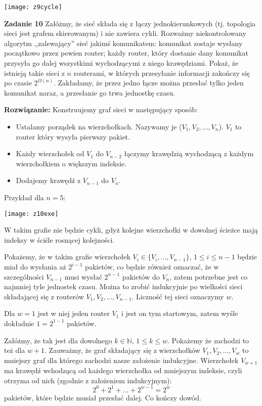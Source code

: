 \documentclass[12pt,a4paper]{article}
\begin{document}
\begin{center}
	\texttt{[image: z9cycle]}	
\end{center}

\vskip 0.2cm
\noindent
\textbf{Zadanie 10} Załóżmy, że sieć składa się z łączy jednokierunkowych (tj. topologia sieci jest grafem skierowanym) i nie zawiera cykli. Rozważmy niekontrolowany algorytm ,,zalewający'' sieć jakimś komunikatem: komunikat zostaje wysłany początkowo przez pewien router; każdy router, który dostanie dany komunikat przysyła go dalej wszystkimi wychodzącymi z niego krawędziami. Pokaż, że istnieją takie sieci z \(n\) routerami, w których przesyłanie informacji zakończy się po czasie \(2^{\Omega(n)}\). Zakładamy, że przez jedno łącze można przesłać tylko jeden komunikat naraz, a przesłanie go trwa jednostkę czasu.
\vskip 0.2cm

\noindent
\textbf{Rozwiązanie:} Konstruujemy graf sieci w następujący sposób:

\begin{itemize}
	\item Ustalamy porządek na wierzchołkach. Nazywamy je (\(V_1, V_2, ..., V_n\)). \(V_1\) to router który wysyła pierwszy pakiet.
	\item Każdy wierzchołek od \(V_1\) do \(V_{n-2}\) łączymy krawędzią wychodzącą z każdym wierzchołkiem o większym indeksie.
	\item Dodajemy krawędź z \(V_{n-1}\) do \(V_n\).
\end{itemize}

\noindent
Przykład dla \(n=5\):

\begin{center}
	\texttt{[image: z10exe]}	
\end{center}

\noindent
W takim grafie nie będzie cykli, gdyż kolejne wierzchołki w dowolnej ścieżce mają indeksy w ściśle rosnącej kolejności.

Pokażemy, że w takim grafie wierzchołek \(V_i \in \{V_i,...,V_{n-1}\} \), \( 1 \leq i \leq n-1\) będzie miał do wysłania aż \(2^{i-1}\) pakietów, co będzie również oznaczać, że w szczególności \(V_{n-1}\) musi wysłać \(2^{n-1}\) pakietów do \(V_n\), zatem potrzebne jest co najmniej tyle jednostek czasu. Można to zrobić indukcyjnie po wielkości sieci składającej się z routerów \(V_1, V_2, ..., V_{n-1}\). Liczność tej sieci oznaczymy \(w\).

Dla \(w=1\) jest w niej jeden router \(V_1\) i jest on tym startowym, zatem wyśle dokładnie \(1 = 2^{1 - 1}\) pakietów.

Załóżmy, że tak jest dla dowolnego \(k \in \mathbb{N}\), \( 1 \leq k \leq w\). Pokażemy że zachodzi to też dla \(w+1\). Zauważmy, że graf składający się z wierzchołków \(V_1, V_2, ..., V_{w}\) to mniejszy  graf dla którego zachodzi nasze założenie indukcyjne. Wierzchołek \(V_{w+1}\) ma krawędź wchodzącą od każdego wierzchołka od mniejszym indeksie, czyli otrzyma od nich (zgodnie z założeniem indukcyjnym):
\[
	2^0 + 2^1 + ... + 2^{w-1} = 2^{w}
\]
pakietów, które będzie musiał przesłać dalej. Co kończy dowód.
\end{document}
